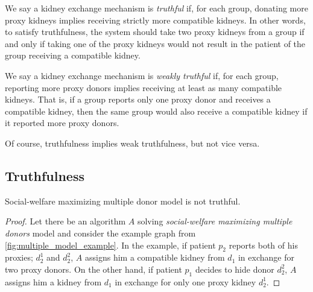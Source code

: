 \begin{definition}[Truthfulness]
We say a kidney exchange mechanism is \emph{truthful} if, for each group, donating more proxy kidneys implies receiving strictly more compatible kidneys. In other words, to satisfy truthfulness, the system should take two proxy kidneys from a group if and only if taking one of the proxy kidneys would not result in the patient of the group receiving a compatible kidney.
\end{definition}

\begin{definition}
We say a kidney exchange mechanism is \emph{weakly truthful} if, for each group, reporting more proxy donors implies receiving at least as many compatible kidneys. That is, if a group reports only one proxy donor and receives a compatible kidney, then the same group would also receive a compatible kidney if it reported more proxy donors.
\end{definition}

Of course, truthfulness implies weak truthfulness, but not vice versa.

\subsection{Truthfulness}
\begin{lemma}
    \label{lemma:social_walfare_not_strongly_truthful}
    Social-welfare maximizing multiple donor model is not truthful.
    \begin{proof}
        Let there be an algorithm $A$ solving \textit{social-welfare maximizing multiple donors} model and consider the example graph from \autoref{fig:multiple_model_example}. In the example, if patient $p_2$ reports both of his proxies; $d_2^1$ and $d_2^2$, $A$ assigns him a compatible kidney from $d_1$ in exchange for two proxy donors. On the other hand, if patient $p_1$ decides to hide donor $d_2^2$, $A$ assigns him a kidney from $d_1$ in exchange for only one proxy kidney $d_2^1$.
    \end{proof}
\end{lemma}


